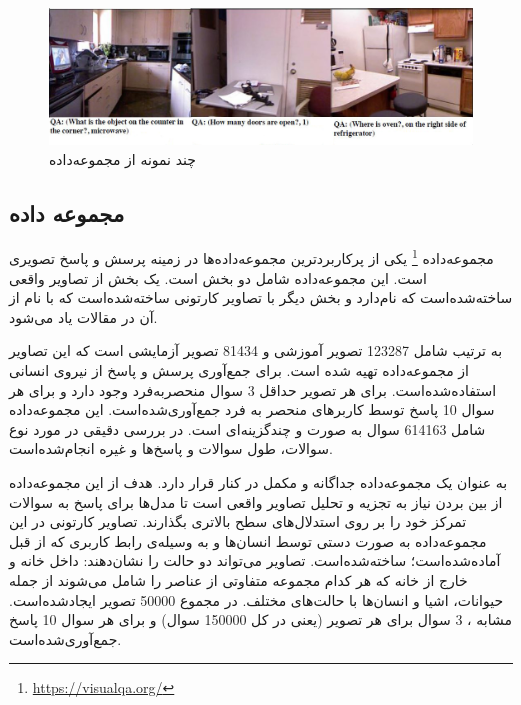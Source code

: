   \begin{figure}[h]
  	\centerline{\includegraphics[scale=0.5]{images/DAQUAR.jpg}}
  	\caption{چند نمونه از مجموعه‌داده  \cite{malinowski2014multi}}
  	\label{fig:DAQUARExample}
  \end{figure}

\subsection{مجموعه داده  \cite{antol2015vqa} \cite{goyal2017making}}

مجموعه‌داده
 \footnote{\href{https://visualqa.org/}{https://visualqa.org/}}
یکی از پرکاربردترین مجموعه‌داده‌ها در زمینه پرسش و پاسخ تصویری است. این مجموعه‌داده شامل دو بخش است. یک بخش از تصاویر واقعی ساخته‌شده‌است که
 نام‌دارد و بخش دیگر با تصاویر کارتونی ساخته‌شده‌است که با نام 
 از آن در مقالات یاد می‌شود.
 
 به ترتیب شامل 123287 تصویر آموزشی و 81434 تصویر آزمایشی است که این تصاویر از مجموعه‌داده
 \cite{lin2014microsoft}
  تهیه شده است.  برای جمع‌آوری پرسش و پاسخ از نیروی انسانی استفاده‌شده‌است. برای هر تصویر حداقل 3 سوال منحصربه‌فرد وجود دارد و برای هر سوال 10 پاسخ توسط کاربرهای منحصر به فرد جمع‌آوری‌شده‌است. این مجموعه‌داده شامل 614163 سوال به صورت 
  و چندگزینه‌ای است. در 
  \cite{antol2015vqa}
  بررسی دقیقی در مورد نوع سوالات، طول سوالات و پاسخ‌ها و غیره انجام‌شده‌است.
  
  
 به عنوان یک مجموعه‌داده جداگانه و مکمل در کنار
 قرار دارد. هدف از این مجموعه‌داده از بین بردن نیاز به تجزیه و تحلیل تصاویر واقعی است تا مدل‌ها برای پاسخ به سوالات تمرکز خود را بر روی استدلال‌های سطح بالاتری بگذارند. تصاویر کارتونی در این مجموعه‌داده به صورت دستی توسط انسان‌ها و به وسیله‌ی رابط کاربری که از قبل آماده‌شده‌است؛ ساخته‌شده‌است. تصاویر می‌تواند دو حالت را نشان‌دهند: داخل خانه و خارج از خانه که هر کدام مجموعه متفاوتی از عناصر را شامل می‌شوند از جمله حیوانات، اشیا و انسان‌ها با حالت‌های مختلف. در مجموع 50000 تصویر ایجاد‌شده‌است. مشابه 
 ، 3 سوال برای هر تصویر (یعنی در کل 150000 سوال) و برای هر سوال 10 پاسخ  جمع‌آوری‌شده‌است.
 
